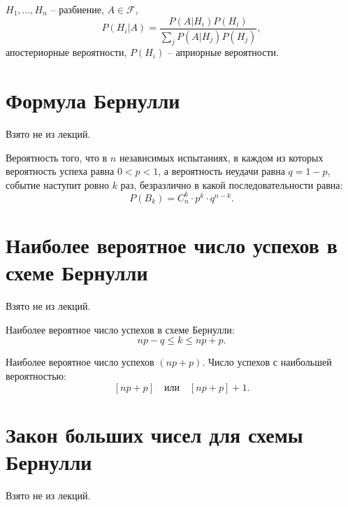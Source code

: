 \begin{theorem}
	$H_1,\ldots ,H_n$ -- разбиение, $A \in \mathcal{F}$,
	\[
		P(H_i | A) = \frac{P(A | H_i)P(H_i)}{\sum_{j} P(A | H_j)P(H_j)},
	\]
	апостериорные вероятности, $P(H_i )$ -- априорные вероятности.
\end{theorem}

\section{Формула Бернулли}

\begin{note}
	Взято не из лекций.
\end{note}

\begin{theorem}
	Вероятность того, что в $n$ независимых испытаниях, в каждом из которых вероятность успеха равна $0 < p < 1$, а вероятность неудачи равна $q = 1 -p$, событие наступит ровно $k$ раз, безразлично в какой последовательности равна:
	\[
		P(B_k) = C_{n}^{k} \cdot p^k \cdot q^{n-k}.
	\]
\end{theorem}

\section{Наиболее вероятное число успехов в схеме Бернулли}

\begin{note}
	Взято не из лекций.
\end{note}

\begin{note}
	Наиболее вероятное число успехов в схеме Бернулли:
	\[
		np - q \leqslant k \leqslant np + p.
	\]

	Наиболее вероятное число успехов $(np + p)$. Число успехов с наибольшей вероятностью:
	\[
		[np + p] \quad \text{или} \quad [np + p] + 1.
	\]
\end{note}

\newpage

\section{Закон больших чисел для схемы Бернулли}

\begin{note}
	Взято не из лекций.
\end{note}

